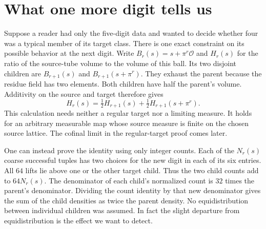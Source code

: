 \documentclass[12pt,letterpaper]{article}
\begin{document}
\section{What one more digit tells us}
Suppose a reader had only the five-digit data and wanted to decide whether four was a typical member of its target class. There is one exact constraint on its possible behavior at the next digit. Write $B_r(s)=s+\pi^r\mathcal O$ and $H_r(s)$ for the ratio of the source-tube volume to the volume of this ball. Its two disjoint children are $B_{r+1}(s)$ and $B_{r+1}(s+\pi^r)$. They exhaust the parent because the residue field has two elements. Both children have half the parent's volume. Additivity on the source and target therefore gives
\[
 H_r(s)=\tfrac12H_{r+1}(s)+\tfrac12H_{r+1}(s+\pi^r).
\]
This calculation needs neither a regular target nor a limiting measure. It holds for an arbitrary measurable map whose source measure is finite on the chosen source lattice. The cofinal limit in the regular-target proof comes later.
\par
One can instead prove the identity using only integer counts. Each of the $N_r(s)$ coarse successful tuples has two choices for the new digit in each of its six entries. All $64$ lifts lie above one or the other target child. Thus the two child counts add to $64N_r(s)$. The denominator of each child's normalized count is $32$ times the parent's denominator. Dividing the count identity by that new denominator gives the sum of the child densities as twice the parent density. No equidistribution between individual children was assumed. In fact the slight departure from equidistribution is the effect we want to detect.
\end{document}
